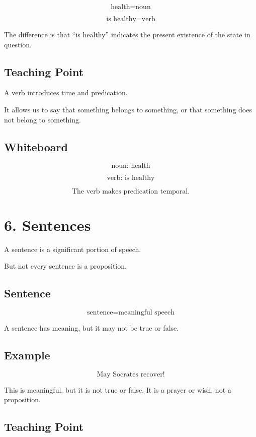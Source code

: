 \documentclass[12pt]{article}
\begin{document}
\[
\text{health} = \text{noun}
\]

\[
\text{is healthy} = \text{verb}
\]

The difference is that ``is healthy'' indicates the present existence of the
state in question.

\subsection*{Teaching Point}

A verb introduces time and predication.

It allows us to say that something belongs to something, or that something does
not belong to something.

\subsection*{Whiteboard}

\[
\text{noun: health}
\]

\[
\text{verb: is healthy}
\]

\[
\boxed{
\text{The verb makes predication temporal.}
}
\]

\section*{6. Sentences}

A sentence is a significant portion of speech.

But not every sentence is a proposition.

\subsection*{Sentence}

\[
\boxed{
\text{sentence} = \text{meaningful speech}
}
\]

A sentence has meaning, but it may not be true or false.

\subsection*{Example}

\[
\text{May Socrates recover!}
\]

This is meaningful, but it is not true or false. It is a prayer or wish, not a
proposition.

\subsection*{Teaching Point}
\end{document}

